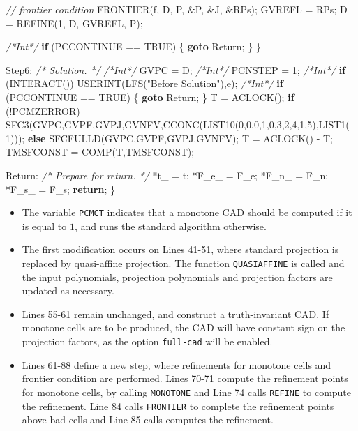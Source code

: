 \documentclass[
]{book}
\newenvironment{Shaded}{\begin{snugshade}}{\end{snugshade}}
\newcommand{\CharTok}[1]{\textcolor[rgb]{0.31,0.60,0.02}{#1}}
\newcommand{\CommentTok}[1]{\textcolor[rgb]{0.56,0.35,0.01}{\textit{#1}}}
\newcommand{\ControlFlowTok}[1]{\textcolor[rgb]{0.13,0.29,0.53}{\textbf{#1}}}
\newcommand{\DecValTok}[1]{\textcolor[rgb]{0.00,0.00,0.81}{#1}}
\newcommand{\NormalTok}[1]{#1}
\newcommand{\StringTok}[1]{\textcolor[rgb]{0.31,0.60,0.02}{#1}}
\providecommand{\tightlist}{%
  \setlength{\itemsep}{0pt}\setlength{\parskip}{0pt}}
\theoremstyle{definition}
\theoremstyle{definition}
\theoremstyle{definition}
\theoremstyle{definition}
\theoremstyle{remark}
\begin{document}
\begin{Shaded}
\begin{Highlighting}[numbers=left,,]
        \CommentTok{// frontier condition}
\NormalTok{        FRONTIER(f, D, P, \&P, \&J, \&RPs);}
\NormalTok{        GVREFL = RPs;}
\NormalTok{        D = REFINE(}\DecValTok{1}\NormalTok{, D, GVREFL, P);}

        \CommentTok{/*Int*/} \ControlFlowTok{if}\NormalTok{ (PCCONTINUE == TRUE) \{ }\ControlFlowTok{goto}\NormalTok{ Return; \}}
\NormalTok{    \}}

\NormalTok{Step6: }\CommentTok{/* Solution. */}
    \CommentTok{/*Int*/}\NormalTok{ GVPC = D;}
    \CommentTok{/*Int*/}\NormalTok{ PCNSTEP = }\DecValTok{1}\NormalTok{;}
    \CommentTok{/*Int*/} \ControlFlowTok{if}\NormalTok{ (INTERACT()) USERINT(LFS(}\StringTok{"Before Solution"}\NormalTok{),}\CharTok{\textquotesingle{}e\textquotesingle{}}\NormalTok{);}
    \CommentTok{/*Int*/} \ControlFlowTok{if}\NormalTok{ (PCCONTINUE == TRUE) \{ }\ControlFlowTok{goto}\NormalTok{ Return; \}}
\NormalTok{    T = ACLOCK();}
    \ControlFlowTok{if}\NormalTok{ (!PCMZERROR)}
\NormalTok{        SFC3(GVPC,GVPF,GVPJ,GVNFV,CCONC(LIST10(}\DecValTok{0}\NormalTok{,}\DecValTok{0}\NormalTok{,}\DecValTok{0}\NormalTok{,}\DecValTok{1}\NormalTok{,}\DecValTok{0}\NormalTok{,}\DecValTok{3}\NormalTok{,}\DecValTok{2}\NormalTok{,}\DecValTok{4}\NormalTok{,}\DecValTok{1}\NormalTok{,}\DecValTok{5}\NormalTok{),LIST1({-}}\DecValTok{1}\NormalTok{)));}
    \ControlFlowTok{else}
\NormalTok{        SFCFULLD(GVPC,GVPF,GVPJ,GVNFV);}
\NormalTok{    T = ACLOCK() {-} T;}
\NormalTok{    TMSFCONST = COMP(T,TMSFCONST);}

\NormalTok{Return: }\CommentTok{/* Prepare for return. */}
\NormalTok{    *t\_ = t;}
\NormalTok{    *F\_e\_ = F\_e;}
\NormalTok{    *F\_n\_ = F\_n;}
\NormalTok{    *F\_s\_ = F\_s;}
    \ControlFlowTok{return}\NormalTok{;}
\NormalTok{\}}
\end{Highlighting}
\end{Shaded}

\begin{itemize}
\tightlist
\item
  The variable \texttt{PCMCT} indicates that a monotone CAD should be computed if it is equal to \(1\), and runs the standard algorithm otherwise.
\item
  The first modification occurs on Lines 41-51, where standard projection is replaced by quasi-affine projection. The function \texttt{QUASIAFFINE} is called and the input polynomials, projection polynomials and projection factors are updated as necessary.
\item
  Lines 55-61 remain unchanged, and construct a truth-invariant CAD. If monotone cells are to be produced, the CAD will have constant sign on the projection factors, as the option \texttt{full-cad} will be enabled.
\item
  Lines 61-88 define a new step, where refinements for monotone cells and frontier condition are performed. Lines 70-71 compute the refinement points for monotone cells, by calling \texttt{MONOTONE} and Line 74 calls \texttt{REFINE} to compute the refinement. Line 84 calls \texttt{FRONTIER} to complete the refinement points above bad cells and Line 85 calls computes the refinement.
\end{itemize}
\end{document}
